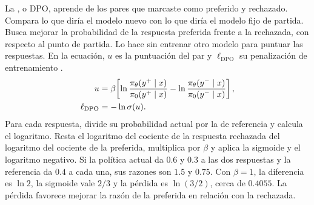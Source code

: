 {La , o DPO, aprende de los pares que marcaste como preferido y rechazado. Compara lo que diría el modelo nuevo con lo que diría el modelo fijo de partida. Busca mejorar la probabilidad de la respuesta preferida frente a la rechazada, con respecto al punto de partida. Lo hace sin entrenar otro modelo para puntuar las respuestas. En la ecuación, \(u\) es la puntuación del par y \(\ell_{\mathrm{DPO}}\) su penalización de entrenamiento \citep{dpo}.}
\begin{align}
 u &= \beta\!\left[
 \ln\frac{\pi_\theta(y^+\mid x)}{\pi_0(y^+\mid x)}
 -\ln\frac{\pi_\theta(y^-\mid x)}{\pi_0(y^-\mid x)}
 \right],\notag\\
 \ell_{\mathrm{DPO}}&=-\ln\sigma(u).
 \label{eq:dpo}
\end{align}
{Para cada respuesta, divide su probabilidad actual por la de referencia y calcula el logaritmo. Resta el logaritmo del cociente de la respuesta rechazada del logaritmo del cociente de la preferida, multiplica por \(\beta\) y aplica la sigmoide y el logaritmo negativo. Si la política actual da \(0.6\) y \(0.3\) a las dos respuestas y la referencia da \(0.4\) a cada una, sus razones son \(1.5\) y \(0.75\). Con \(\beta=1\), la diferencia es \(\ln 2\), la sigmoide vale \(2/3\) y la pérdida es \(\ln(3/2)\), cerca de \(0.4055\). La pérdida favorece mejorar la razón de la preferida en relación con la rechazada.}

